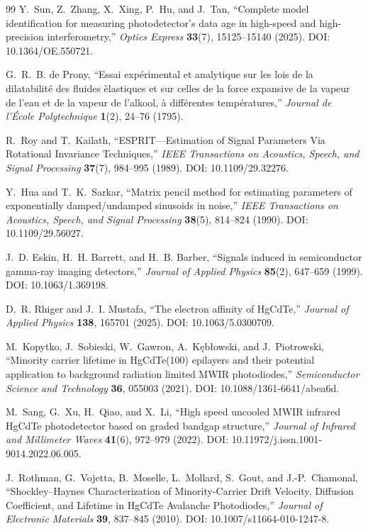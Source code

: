 \documentclass[11pt]{article}
\begin{document}
\begin{thebibliography}{99}
Y.~Sun, Z.~Zhang, X.~Xing, P.~Hu, and J.~Tan, ``Complete model identification for measuring photodetector's data age in high-speed and high-precision interferometry,'' \emph{Optics Express} \textbf{33}(7), 15125--15140 (2025). DOI: 10.1364/OE.550721.


G.~R.~B. de Prony, ``Essai exp\'erimental et analytique sur les lois de la dilatabilit\'e des fluides \`elastiques et sur celles de la force expansive de la vapeur de l'eau et de la vapeur de l'alkool, \`a diff\'erentes temp\'eratures,'' \emph{Journal de l'\'Ecole Polytechnique} \textbf{1}(2), 24--76 (1795).

R.~Roy and T.~Kailath, ``ESPRIT---Estimation of Signal Parameters Via Rotational Invariance Techniques,'' \emph{IEEE Transactions on Acoustics, Speech, and Signal Processing} \textbf{37}(7), 984--995 (1989). DOI: 10.1109/29.32276.

Y.~Hua and T.~K.~Sarkar, ``Matrix pencil method for estimating parameters of exponentially damped/undamped sinusoids in noise,'' \emph{IEEE Transactions on Acoustics, Speech, and Signal Processing} \textbf{38}(5), 814--824 (1990). DOI: 10.1109/29.56027.

J.~D. Eskin, H.~H. Barrett, and H.~B. Barber, ``Signals induced in semiconductor gamma-ray imaging detectors,'' \emph{Journal of Applied Physics} \textbf{85}(2), 647--659 (1999). DOI: 10.1063/1.369198.

D.~R. Rhiger and J.~I. Mustafa, ``The electron affinity of HgCdTe,'' \emph{Journal of Applied Physics} \textbf{138}, 165701 (2025). DOI: 10.1063/5.0300709.

M.~Kopytko, J.~Sobieski, W.~Gawron, A.~K\k{e}b\l{}owski, and J.~Piotrowski, ``Minority carrier lifetime in HgCdTe(100) epilayers and their potential application to background radiation limited MWIR photodiodes,'' \emph{Semiconductor Science and Technology} \textbf{36}, 055003 (2021). DOI: 10.1088/1361-6641/abea6d.

M.~Sang, G.~Xu, H.~Qiao, and X.~Li, ``High speed uncooled MWIR infrared HgCdTe photodetector based on graded bandgap structure,'' \emph{Journal of Infrared and Millimeter Waves} \textbf{41}(6), 972--979 (2022). DOI: 10.11972/j.issn.1001-9014.2022.06.005.

J.~Rothman, G.~Vojetta, B.~Moselle, L.~Mollard, S.~Gout, and J.-P.~Chamonal, ``Shockley--Haynes Characterization of Minority-Carrier Drift Velocity, Diffusion Coefficient, and Lifetime in HgCdTe Avalanche Photodiodes,'' \emph{Journal of Electronic Materials} \textbf{39}, 837--845 (2010). DOI: 10.1007/s11664-010-1247-8.


\end{thebibliography}
\end{document}
